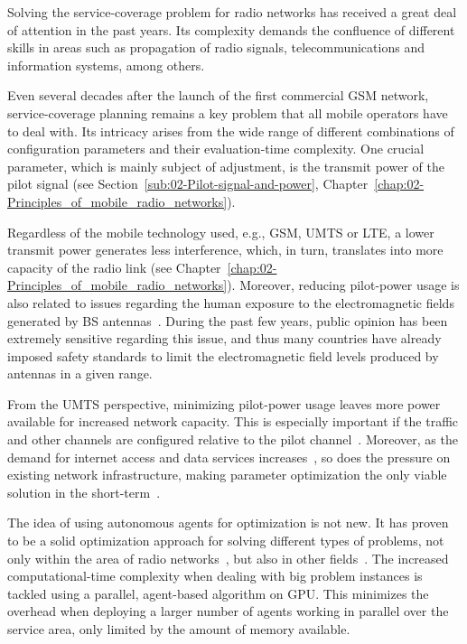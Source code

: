 Solving the service-coverage problem for radio networks has received
a great deal of attention in the past years. Its complexity demands
the confluence of different skills in areas such as propagation of
radio signals, telecommunications and information systems, among others.

Even several decades after the launch of the first commercial GSM
network, service-coverage planning remains a key problem that all
mobile operators have to deal with. Its intricacy arises from the
wide range of different combinations of configuration parameters and
their evaluation-time complexity. One crucial parameter, which is
mainly subject of adjustment, is the transmit power of the pilot signal
(see Section~\ref{sub:02-Pilot-signal-and-power}, Chapter~\ref{chap:02-Principles_of_mobile_radio_networks}).

Regardless of the mobile technology used, e.g., GSM, UMTS or LTE,
a lower transmit power generates less interference, which, in turn,
translates into more capacity of the radio link (see Chapter~\ref{chap:02-Principles_of_mobile_radio_networks}).
Moreover, reducing pilot-power usage is also related to issues regarding
the human exposure to the electromagnetic fields generated by BS antennas~\cite{Esposito_Genetic.optimization.for.optimum.3G.network.planning:2010}.
During the past few years, public opinion has been extremely sensitive
regarding this issue, and thus many countries have already imposed
safety standards to limit the electromagnetic field levels produced
by antennas in a given range.

From the UMTS perspective, minimizing pilot-power usage leaves more
power available for increased network capacity. This is especially
important if the traffic and other channels are configured relative
to the pilot channel~\cite{Holma_WCDMA.for.UMTS:2005}. Moreover,
as the demand for internet access and data services increases~\cite{Cunningham_Network.growth.theory.and.evidence:2010},
so does the pressure on existing network infrastructure, making parameter
optimization the only viable solution in the short-term~\cite{Nawrocki_Understanding:2006}.

\bigskip{}


The idea of using autonomous agents for optimization is not new. It
has proven to be a solid optimization approach for solving different
types of problems, not only within the area of radio networks~\cite{Cheung_Realtime.video.using.agent.over.3G.networks:2005,Esposito_Genetic.optimization.for.optimum.3G.network.planning:2010},
but also in other fields~\cite{Valcarce_Applying.FDTD.to.the.coverage.prediction.of.WiMAX:2009,Vasile_Hybrid.multiagent.approach.for.optimization:2009}.
The increased computational-time complexity when dealing with big
problem instances is tackled using a parallel, agent-based algorithm
on GPU. This minimizes the overhead when deploying a larger number
of agents working in parallel over the service area, only limited
by the amount of memory available.


